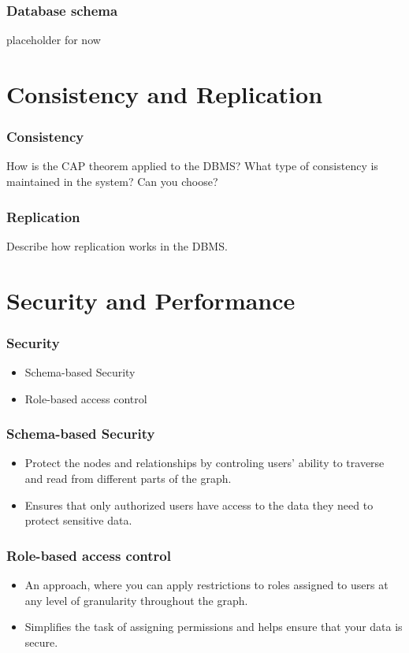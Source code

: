 \documentclass[aspectratio=169]{beamer}
\begin{document}
\begin{frame}[containsverbatim]
    \frametitle{Database schema}
    placeholder for now
\end{frame}

\section{Consistency and Replication}
\begin{frame}
    \frametitle{Consistency}
    
    How is the CAP theorem applied to the DBMS? What type of consistency
is maintained in the system? Can you choose?

\end{frame}

\begin{frame}
    \frametitle{Replication}

    Describe how replication works in the DBMS.
\end{frame}

\section{Security and Performance}

\begin{frame}
    \frametitle{Security}

    \begin{itemize}
        \item Schema-based Security 
        \item Role-based access control 
    \end{itemize}
\end{frame}

\begin{frame}
    \frametitle{Schema-based Security}
    \begin{itemize}
        \item Protect the nodes and relationships by controling users' ability to traverse and read from different parts of the graph.
        \item Ensures that only authorized users have access to the data they need to protect sensitive data.
    \end{itemize}
\end{frame}

\begin{frame}
    \frametitle{Role-based access control}
    \begin{itemize}
        \item An approach, where you can apply restrictions to roles assigned to users at any level of granularity throughout the graph.
        \item Simplifies the task of assigning permissions and helps ensure that your data is secure.
    \end{itemize}
\end{frame}
\end{document}
